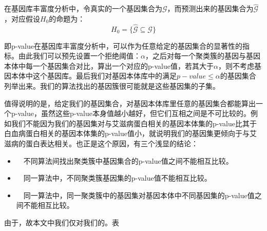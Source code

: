 \vspace{2mm}
在基因库丰富度分析中，令真实的一个基因集合为$\mathcal{G}$，而预测出来的基因集合为$\hat{\mathcal{G}}$，对应假设$H_0$的命题为：
\begin{equation*}
H_0 = \{\hat{\mathcal{G}}\subseteq{}\mathcal{G}\}
\end{equation*}

即p-value在基因库丰富度分析中，可以作为任意给定的基因集合的显著性的指标。由此我们可以预先设置一个拒绝阈值：$\alpha$，之后对每一个聚类簇的基因与基因本体中每一个基因集合对比，算出一个对应的p-value值，若其大于$\alpha$，则不考虑基因本体中这个基因库。最后我们对基因本体库中的满足$p-value\leq\alpha$的基因集合列举出来。我们的算法找出的基因簇很可能就是这些基因集的子集。

值得说明的是，给定我们的基因集合，对基因本体库里任意的基因集合都能算出一个p-value，虽然这些p-value本身值越小越好，但它们互相之间是不可比较的。例如我们不能因为我们的基因集对与艾滋病蛋白相关的基因本体集的p-value比其于白血病蛋白相关的基因本体集的p-value值小，就说明我们的基因集更倾向于与艾滋病的蛋白表达相关。也正是这个原因，有三个浅显的结论：
\begin{itemize}
\item ~~不同算法间找出聚类簇中基因集合的p-value值之间不能相互比较。
\item ~~同一算法中，不同聚类簇基因集的p-value值不能相互比较。
\item ~~同一算法中，同一聚类簇中的基因集对基因本体中不同基因集的p-value值之间不能相互比较。
\end{itemize}

由于，故本文中我们仅对我们的。表

